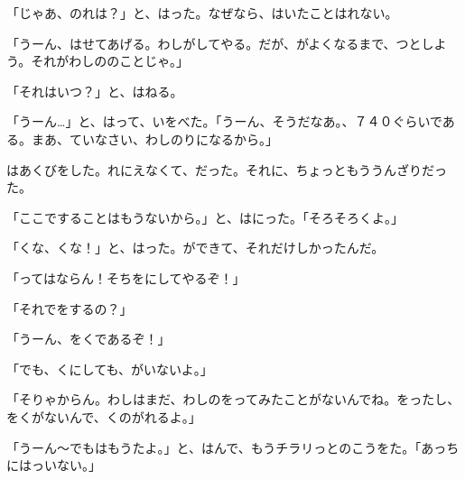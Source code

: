 「じゃあ、のれは？」と、はった。なぜなら、はいたことはれない。

「うーん、はせてあげる。わしがしてやる。だが、がよくなるまで、つとしよう。それがわしののことじゃ。」

「それはいつ？」と、はねる。

「うーん…」と、はって、いをべた。「うーん、そうだなあ。、７４０ぐらいである。まあ、ていなさい、わしのりになるから。」

はあくびをした。れにえなくて、だった。それに、ちょっともううんざりだった。

「ここですることはもうないから。」と、はにった。「そろそろくよ。」

「くな、くな！」と、はった。ができて、それだけしかったんだ。

「ってはならん！そちをにしてやるぞ！」

「それでをするの？」

「うーん、をくであるぞ！」

「でも、くにしても、がいないよ。」

「そりゃからん。わしはまだ、わしのをってみたことがないんでね。をったし、をくがないんで、くのがれるよ。」

「うーん～でもはもうたよ。」と、はんで、もうチラリっとのこうをた。「あっちにはっいない。」

